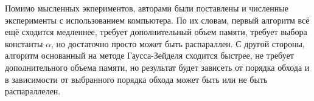 	Помимо мысленных экпериментов, авторами были поставлены и численные эксперименты с использованием компьютера. По их словам, первый алгоритм всё ещё сходится медленнее, требует дополнительный объем памяти, требует выбора константы $\alpha$, но достаточно просто может быть распараллен. С другой стороны, алгоритм основанный на методе Гаусса-Зейделя сходится быстрее, не требует дополнительного объема памяти, но результат будет зависеть от порядка обхода и в зависимости от выбранного порядка обхода может быть или не быть распараллелен.

%
